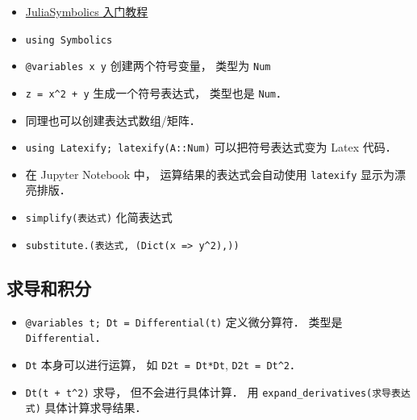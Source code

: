
\begin{itemize}
\item \href{https://symbolics.juliasymbolics.org/dev/tutorials/symbolic_functions/}{JuliaSymbolics 入门教程}
\item \verb|using Symbolics|
\item \verb|@variables x y| 创建两个符号变量， 类型为 \verb|Num|
\item \verb|z = x^2 + y| 生成一个符号表达式， 类型也是 \verb|Num|．
\item 同理也可以创建表达式数组/矩阵．
\item \verb|using Latexify; latexify(A::Num)| 可以把符号表达式变为 Latex 代码．
\item 在 Jupyter Notebook 中， 运算结果的表达式会自动使用 \verb|latexify| 显示为漂亮排版．
\item \verb|simplify(表达式)| 化简表达式
\item \verb|substitute.(表达式, (Dict(x => y^2),))|
\end{itemize}


\subsection{求导和积分}
\begin{itemize}
\item \verb|@variables t; Dt = Differential(t)| 定义微分算符． 类型是 \verb|Differential|．
\item \verb|Dt| 本身可以进行运算， 如 \verb|D2t = Dt*Dt|, \verb|D2t = Dt^2|．
\item \verb|Dt(t + t^2)| 求导， 但不会进行具体计算． 用 \verb|expand_derivatives(求导表达式)| 具体计算求导结果．
\end{itemize}

